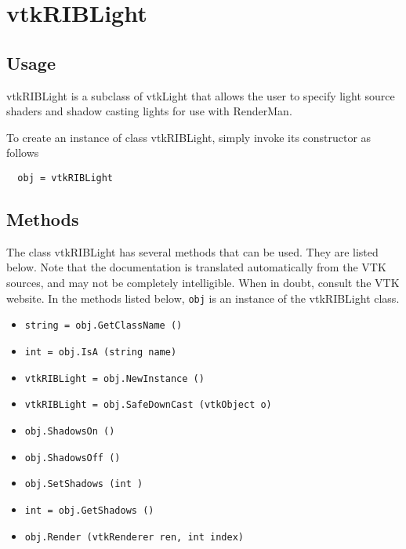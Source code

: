 \section{vtkRIBLight}

\subsection{Usage}

 vtkRIBLight is a subclass of vtkLight that allows the user to
 specify light source shaders and shadow casting lights for use with RenderMan.


To create an instance of class vtkRIBLight, simply
invoke its constructor as follows
\begin{verbatim}
  obj = vtkRIBLight
\end{verbatim}
\subsection{Methods}

The class vtkRIBLight has several methods that can be used.
  They are listed below.
Note that the documentation is translated automatically from the VTK sources,
and may not be completely intelligible.  When in doubt, consult the VTK website.
In the methods listed below, \verb|obj| is an instance of the vtkRIBLight class.
\begin{itemize}
\item  \verb|string = obj.GetClassName ()|

\item  \verb|int = obj.IsA (string name)|

\item  \verb|vtkRIBLight = obj.NewInstance ()|

\item  \verb|vtkRIBLight = obj.SafeDownCast (vtkObject o)|

\item  \verb|obj.ShadowsOn ()|

\item  \verb|obj.ShadowsOff ()|

\item  \verb|obj.SetShadows (int )|

\item  \verb|int = obj.GetShadows ()|

\item  \verb|obj.Render (vtkRenderer ren, int index)|

\end{itemize}

